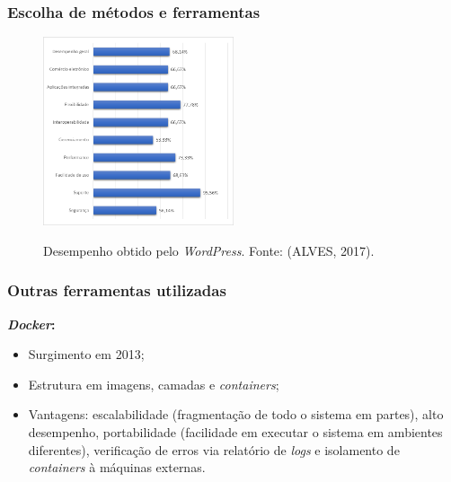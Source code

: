 \documentclass{beamer}
\begin{document}

\begin{frame}
    \frametitle{Escolha de métodos e ferramentas}
    
    \begin{figure}[htb]
        \centering
        \caption{Desempenho obtido pelo \textit{WordPress}. Fonte: (ALVES, 2017).}
        \includegraphics[width=0.5\textwidth]{../figuras/desempenho-wordpress}
        \label{wordpress}
    \end{figure}
        
\end{frame}


\begin{frame}
    \frametitle{Outras ferramentas utilizadas}
    \textbf{\textit{Docker}:} 
    \begin{itemize}
        \item Surgimento em 2013;
        \item Estrutura em imagens, camadas e \textit{containers};
        \item Vantagens: escalabilidade (fragmentação de todo o sistema em partes), alto desempenho, portabilidade (facilidade em executar o sistema em ambientes diferentes), verificação de erros via relatório de \textit{logs} e isolamento de \textit{containers} à máquinas externas. 
        
% 
% 

    \end{itemize}
    
\end{frame}
\end{document}
